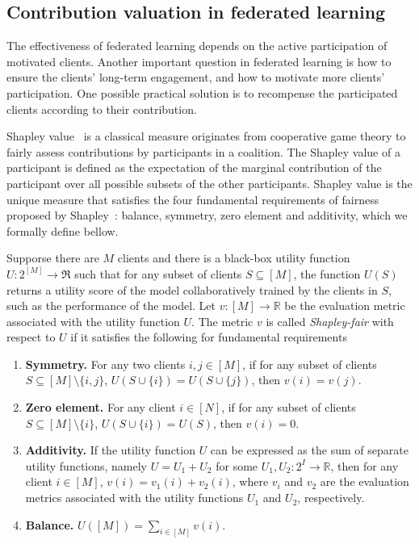 \subsection{Contribution valuation in federated learning} \label{sec:1-4-2}

The effectiveness of federated learning depends on the active participation of motivated clients. Another important question in federated learning is how to ensure the clients’ long-term engagement, and how to motivate more clients' participation. One possible practical solution is to recompense the participated clients according to their contribution. 

Shapley value~\cite{shapley201617} is a classical measure originates from cooperative game theory to fairly assess contributions by participants in a coalition. 
The Shapley value of a participant is defined as the expectation of the marginal contribution of the participant over all possible subsets of the other participants. Shapley value is the unique measure that satisfies the four fundamental requirements of fairness proposed by Shapley~\cite{shapley201617}: balance, symmetry, zero element and additivity, which we formally define bellow. 

\begin{definition} \label{def:shapley}
    Supporse there are $M$ clients and there is a black-box utility function $U:2^{[M]} \to \Re$ such that for any subset of clients $S \subseteq [M]$, the function $U(S)$ returns a utility score of the model collaboratively trained by the clients in $S$, such as the performance of the model. Let $v: [M] \to \mathbb{R}$ be the evaluation metric associated with the utility function $U$. The metric $v$ is called \emph{Shapley-fair} with respect to $U$ if it satisfies the following for fundamental requirements
    \begin{enumerate}
        \item \textbf{Symmetry.} For any two clients $i, j \in [M]$, if for any subset of clients $S \subseteq [M] \setminus \{i,j\}$, $U(S \cup \{i\}) = U(S \cup \{j\})$, then $v(i) = v(j)$. 
        \item \textbf{Zero element.} For any client $i \in [N]$, if for any subset of clients $S \subseteq [M] \setminus \{i\}$, $U(S \cup \{i\}) = U(S)$, then $v(i) = 0$.
        \item \textbf{Additivity.} If the utility function $U$ can be expressed as the sum of separate utility functions, namely $U = U_1 + U_2$ for some $U_1, U_2 : 2^I \to \mathbb{R}$, then for any client $i \in [M]$, $v(i) = v_1(i) + v_2(i)$, where $v_i$ and $v_2$ are the evaluation metrics associated with the utility functions $U_1$ and $U_2$, respectively. 
        \item \textbf{Balance.}  $U([M]) = \sum_{i \in [M]} v(i)$.
    \end{enumerate}
\end{definition}


